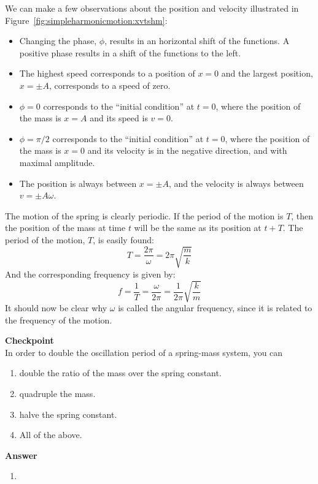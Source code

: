 We can make a few observations about the position and velocity illustrated in Figure~\ref{fig:simpleharmonicmotion:xvtshm}:

\begin{itemize}
\item Changing the phase, $\phi$, results in an horizontal shift of the functions. A positive phase results in a shift of the functions to the left.
\item The highest speed corresponds to a position of $x=0$ and the largest position, $x=\pm A$, corresponds to a speed of zero.
\item $\phi = 0$ corresponds to the ``initial condition'' at $t=0$, where the position of the mass is $x=A$ and its speed is $v=0$.
\item $\phi = \pi/2$ corresponds to the ``initial condition'' at $t=0$,  where the position of the mass is $x=0$ and its velocity is in the negative direction, and with maximal amplitude.
\item The position is always between $x=\pm A$, and the velocity is always between $v=\pm A\omega$.
\end{itemize}

The motion of the spring is clearly periodic. If the period of the motion is $T$, then the position of the mass at time $t$ will be the same as its position at $t+T$. The period of the motion, $T$, is easily found:
\begin{equation}
\boxed{T=\frac{2\pi}{\omega}=2\pi\sqrt{\frac{m}{k}}}
\end{equation}
And the corresponding frequency is given by:
\begin{equation}
\boxed{f = \frac{1}{T}=\frac{\omega}{2\pi}=\frac{1}{2\pi}\sqrt{\frac{k}{m}}}
\end{equation}
It should now be clear why $\omega$ is called the angular frequency, since it is related to the frequency of the motion.

\begin{framed}
\textbf{Checkpoint}\\
In order to double the oscillation period of a spring-mass system, you can

\begin{enumerate}
\item double the ratio of the mass over the spring constant.
\item quadruple the mass.
\item halve the spring constant.
\item All of the above.
\end{enumerate}

\begin{framed}
\textbf{Answer}\\
\begin{enumerate}[resume]
\item
\end{enumerate}
\end{framed}
\end{framed}


